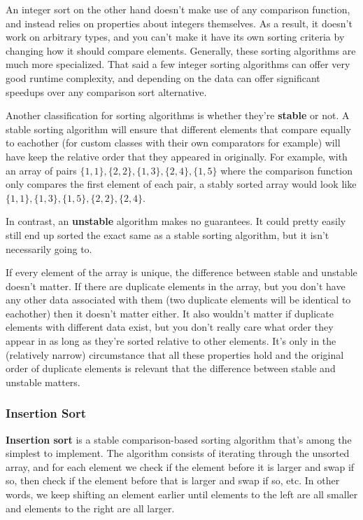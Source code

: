 An integer sort on the other hand doesn't make use of any comparison function, and instead relies on properties about integers themselves. As a result, it doesn't work on arbitrary types, and you can't make it have its own sorting criteria by changing how it should compare elements. Generally, these sorting algorithms are much more specialized. That said a few integer sorting algorithms can offer very good runtime complexity, and depending on the data can offer significant speedups over any comparison sort alternative.

Another classification for sorting algorithms is whether they're \textbf{stable}  or not. A stable sorting algorithm will ensure that different elements that compare equally to eachother (for custom classes with their own comparators for example) will have keep the relative order that they appeared in originally. For example, with an array of pairs $\{1,1\}, \{2,2\}, \{1,3\}, \{2,4\}, \{1,5\}$ where the comparison function only compares the first element of each pair, a stably sorted array would look like $\{1,1\}, \{1,3\}, \{1,5\}, \{2,2\}, \{2,4\}$.

In contrast, an \textbf{unstable}  algorithm makes no guarantees. It could pretty easily still end up sorted the exact same as a stable sorting algorithm, but it isn't necessarily going to.

If every element of the array is unique, the difference between stable and unstable doesn't matter. If there are duplicate elements in the array, but you don't have any other data associated with them (two duplicate elements will be identical to eachother) then it doesn't matter either. It also wouldn't matter if duplicate elements with different data exist, but you don't really care what order they appear in as long as they're sorted relative to other elements. It's only in the (relatively narrow) circumstance that all these properties hold and the original order of duplicate elements is relevant that the difference between stable and unstable matters.

\subsubsection{Insertion Sort}

\textbf{Insertion sort} is a stable comparison-based sorting algorithm that's among the simplest to implement. The algorithm consists of iterating through the unsorted array, and for each element we check if the element before it is larger and swap if so, then check if the element before that is larger and swap if so, etc. In other words, we keep shifting an element earlier until elements to the left are all smaller and elements to the right are all larger.


